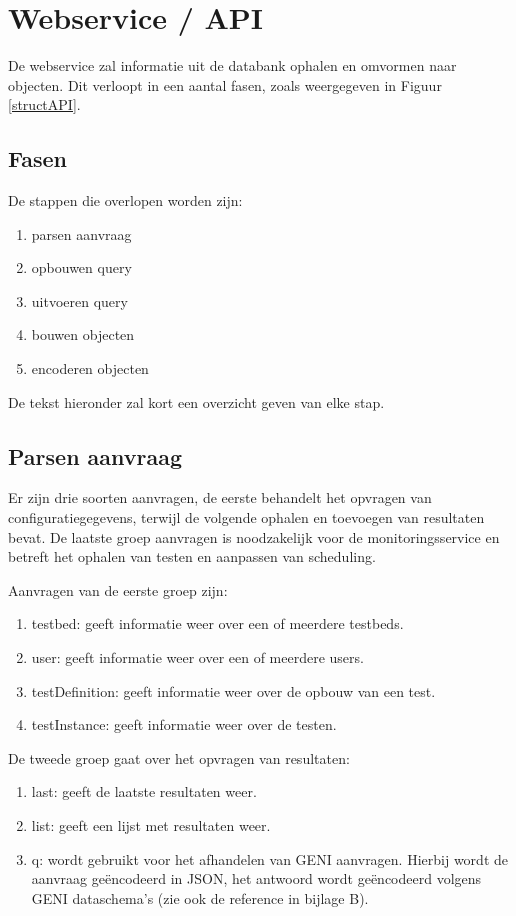 \section{Webservice / API}
\npar
De webservice zal informatie uit de databank ophalen en omvormen naar objecten. Dit verloopt in een aantal fasen, zoals weergegeven in Figuur \ref{structAPI}.
\clearpage
\subsection{Fasen}
\npar
De stappen die overlopen worden zijn:
\begin{enumerate}
\item parsen aanvraag
\item opbouwen query
\item uitvoeren query
\item bouwen objecten
\item encoderen objecten
\end{enumerate}
De tekst hieronder zal kort een overzicht geven van elke stap.
\subsection{Parsen aanvraag}
\npar
Er zijn drie soorten aanvragen, de eerste behandelt het opvragen van configuratiegegevens, terwijl de volgende ophalen en toevoegen van resultaten bevat. De laatste groep aanvragen is noodzakelijk voor de monitoringsservice en betreft het ophalen van testen en aanpassen van scheduling.

\npar
Aanvragen van de eerste groep zijn:
\begin{enumerate}
\item testbed: geeft informatie weer over een of meerdere testbeds.
\item user: geeft informatie weer over een of meerdere users.
\item testDefinition: geeft informatie weer over de opbouw van een test.
\item testInstance: geeft informatie weer over de testen.
\end{enumerate}

De tweede groep gaat over het opvragen van resultaten:
\begin{enumerate}
\item last: geeft de laatste resultaten weer.
\item list: geeft een lijst met resultaten weer.
\item q: wordt gebruikt voor het afhandelen van GENI aanvragen. Hierbij wordt de aanvraag ge\"encodeerd in JSON, het antwoord wordt ge\"encodeerd volgens GENI dataschema's (zie ook de reference in bijlage B).
\end{enumerate}

